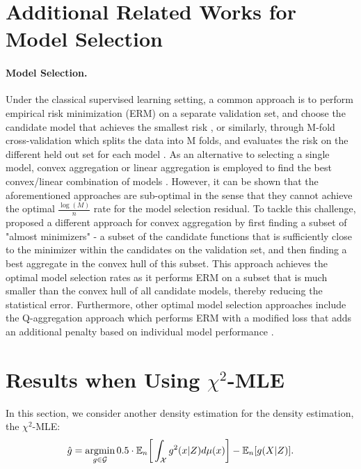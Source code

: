 \section{Additional Related Works for Model Selection}\label{sec:related-works}
\paragraph{Model Selection.}Under the classical supervised learning setting, a common approach is to perform empirical risk minimization (ERM) on a separate validation set, and choose the candidate model that achieves the smallest risk \citep{modelSelection}, or similarly, through M-fold cross-validation which splits the data into M folds, and evaluates the risk on the different held out set for each model \citep{crossVal}. As an alternative to selecting a single model, convex aggregation or linear aggregation is employed to find the best convex/linear combination of models \citep{convexAgg, linearAgg}. However, it can be shown that the aforementioned approaches are sub-optimal in the sense that they cannot achieve the optimal $\frac{\log(M)}{n}$ rate for the model selection residual. To tackle this challenge, \cite{lecue2009aggregation} proposed a different approach for convex aggregation by first finding a subset of "almost minimizers" - a subset of the candidate functions that is sufficiently close to the minimizer within the candidates on the validation set, and then finding a best aggregate in the convex hull of this subset. This approach achieves the optimal model selection rates as it performs ERM on a subset that is much smaller than the convex hull of all candidate models, thereby reducing the statistical error. Furthermore, other optimal model selection approaches include the Q-aggregation approach which performs ERM with a modified loss that adds an additional penalty based on individual model performance \citep{lecue2014optimal}. 

\section{Results when Using $\chi^2$-MLE}\label{sec:chi2}
In this section, we consider another density estimation for the density estimation, the $\chi^2$-MLE: 
 \begin{align}\label{eq:chi2-mle-est}
\hat{g} = \mathop{\mathrm{argmin}}_{g\in\mathcal{G}} 0.5\cdot \mathbb{E}_n\bigg[\int_{\mathcal{X}} g^2(x|Z)d\mu(x)\bigg] - \mathbb{E}_n[g(X|Z)]. 
\end{align}



